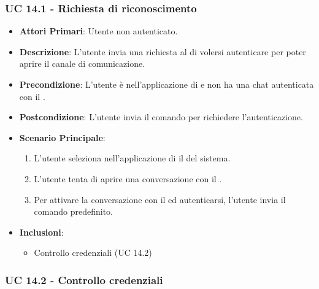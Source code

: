 	\subsubsection{UC 14.1 - Richiesta di riconoscimento}

	\begin{itemize}
		\item \textbf{Attori Primari}: Utente non autenticato.
		\item \textbf{Descrizione}: L'utente invia una richiesta al  di volersi autenticare per poter aprire il canale di comunicazione.
		\item \textbf{Precondizione}: L'utente è nell'applicazione di  e non ha una chat autenticata con il .
		\item \textbf{Postcondizione}: L'utente invia il comando per richiedere l'autenticazione.
		\item \textbf{Scenario Principale}:
		\begin{enumerate}
			\item L'utente seleziona nell'applicazione di  il  del sistema.
			\item L'utente tenta di aprire una conversazione con il .
			\item Per attivare la conversazione con il  ed autenticarsi, l'utente invia il comando predefinito.
		\end{enumerate}
		\item \textbf{Inclusioni}:
		\begin{itemize}
			\item Controllo credenziali (UC 14.2)
		\end{itemize}
	\end{itemize}

	\subsubsection{UC 14.2 - Controllo credenziali}

